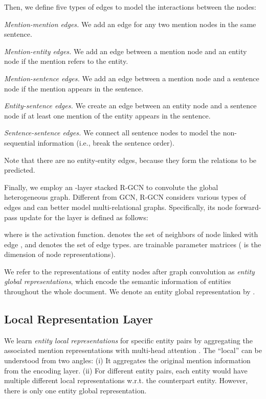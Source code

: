 \documentclass[11pt,a4paper]{article}
\begin{document}
Then, we define five types of edges to model the interactions between the nodes:
\begin{compactitem}
\item \emph{Mention-mention edges.} We add an edge for any two mention nodes in the same sentence.

\item \emph{Mention-entity edges.} We add an edge between a mention node and an entity node if the mention refers to the entity.

\item \emph{Mention-sentence edges.} We add an edge between a mention node and a sentence node if the mention appears in the sentence.

\item \emph{Entity-sentence edges.} We create an edge between an entity node and a sentence node if at least one mention of the entity appears in the sentence.

\item \emph{Sentence-sentence edges.} We connect all sentence nodes to model the non-sequential information (i.e., break the sentence order).
\end{compactitem}

Note that there are no entity-entity edges, because they form the relations to be predicted.

Finally, we employ an -layer stacked R-GCN \cite{schlichtkrull2018modeling} to convolute the global heterogeneous graph. Different from GCN, R-GCN considers various types of edges and can better model multi-relational graphs. Specifically, its node forward-pass update for the  layer is defined as follows:
 
where  is the activation function.  denotes the set of neighbors of node  linked with edge , and  denotes the set of edge types.  are trainable parameter matrices ( is the dimension of node representations).

We refer to the representations of entity nodes after graph convolution as \emph{entity global representations}, which encode the semantic information of entities throughout the whole document. We denote an entity global representation by .

\subsection{Local Representation Layer}

We learn \emph{entity local representations} for specific entity pairs by aggregating the associated mention representations with multi-head attention  \cite{vaswani2017attention}. The ``local'' can be understood from two angles: (i) It aggregates the original mention information from the encoding layer. (ii) For different entity pairs, each entity would have multiple different local representations w.r.t. the counterpart entity. However, there is only one entity global representation.
\end{document}
